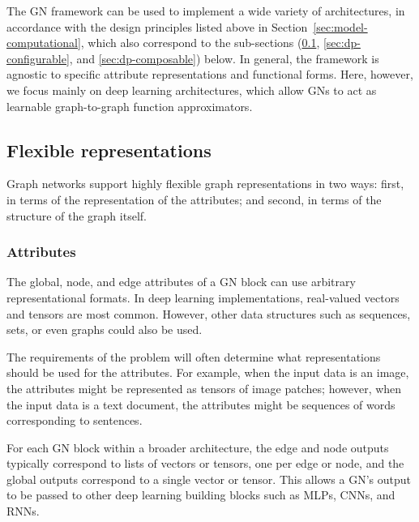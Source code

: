 The GN framework can be used to implement a wide variety of architectures, in accordance with the design principles listed above in Section~\ref{sec:model-computational}, which also correspond to the sub-sections (\ref{sec:dp-representations}, \ref{sec:dp-configurable}, and \ref{sec:dp-composable}) below. In general, the framework is agnostic to specific attribute representations and functional forms. Here, however, we focus mainly on deep learning architectures, which allow GNs to act as learnable graph-to-graph function approximators.


\subsection{Flexible representations}
\label{sec:dp-representations}

Graph networks support highly flexible graph representations in two ways: first, in terms of the representation of the attributes; and second, in terms of the structure of the graph itself.

\subsubsection{Attributes}
\label{sec:attributes}

The global, node, and edge attributes of a GN block can use arbitrary representational formats.
In deep learning implementations, real-valued vectors and tensors are most common. However, other data structures such as sequences, sets, or even graphs could also be used. 

The requirements of the problem will often determine what representations should be used for the attributes.
For example, when the input data is an image, the attributes might be represented as tensors of image patches; however, when the input data is a text document, the attributes might be sequences of words corresponding to sentences.

For each GN block within a broader architecture, the edge and node outputs typically correspond to lists of vectors or tensors, one per edge or node, and the global outputs correspond to a single vector or tensor. This allows a GN's output to be passed to other deep learning building blocks such as MLPs, CNNs, and RNNs.

